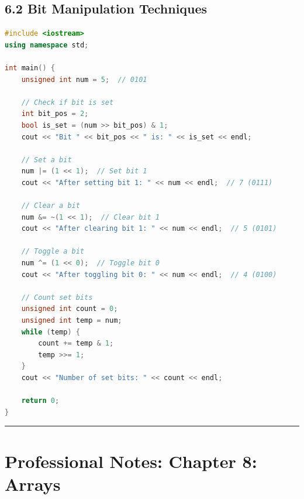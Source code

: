 \hypertarget{bit-manipulation-techniques}{%
\section{6.2 Bit Manipulation
Techniques}\label{bit-manipulation-techniques}}

\begin{lstlisting}[language={C++}]
#include <iostream>
using namespace std;

int main() {
    unsigned int num = 5;  // 0101
    
    // Check if bit is set
    int bit_pos = 2;
    bool is_set = (num >> bit_pos) & 1;
    cout << "Bit " << bit_pos << " is: " << is_set << endl;
    
    // Set a bit
    num |= (1 << 1);  // Set bit 1
    cout << "After setting bit 1: " << num << endl;  // 7 (0111)
    
    // Clear a bit
    num &= ~(1 << 1);  // Clear bit 1
    cout << "After clearing bit 1: " << num << endl;  // 5 (0101)
    
    // Toggle a bit
    num ^= (1 << 0);  // Toggle bit 0
    cout << "After toggling bit 0: " << num << endl;  // 4 (0100)
    
    // Count set bits
    unsigned int count = 0;
    unsigned int temp = num;
    while (temp) {
        count += temp & 1;
        temp >>= 1;
    }
    cout << "Number of set bits: " << count << endl;
    
    return 0;
}
\end{lstlisting}

\begin{center}\rule{0.5\linewidth}{0.5pt}\end{center}

\hypertarget{professional-notes-chapter-8-arrays}{%
\chapter{Professional Notes: Chapter 8:
Arrays}\label{professional-notes-chapter-8-arrays}}

